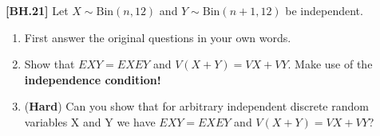 \begin{exercise}
	\textbf{[BH.21]} Let $X \sim \text{Bin}(n, 12)$ and $Y \sim \text{Bin}(n + 1, 12)$ be independent.
	\begin{enumerate} 
		\item First answer the original questions in your own words.
		\item Show that $EXY=EXEY$ and $V(X+Y)=VX+VY$. Make use of the \textbf{independence condition!}  
		\item (\textbf{Hard}) Can you show that for arbitrary independent discrete random variables X and Y we have  $EXY=EXEY$ and $V(X+Y)=VX+VY$?
	\end{enumerate}
\end{exercise}
